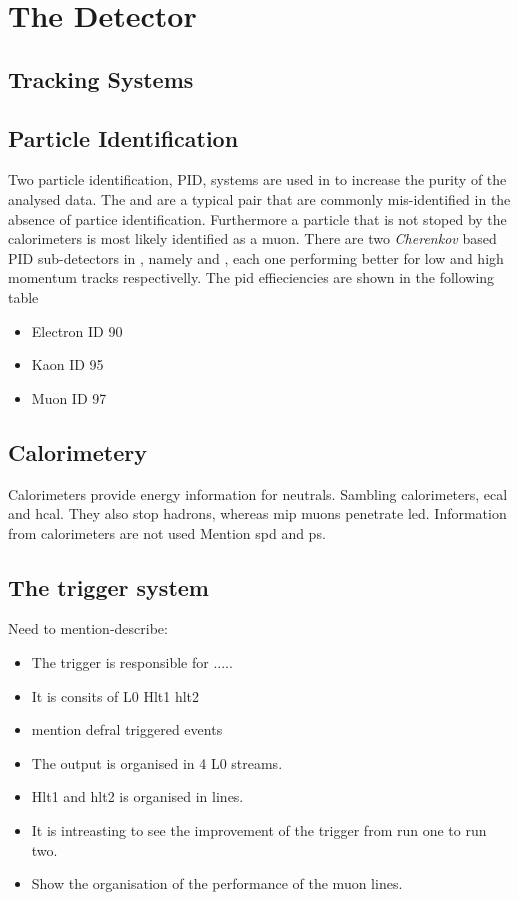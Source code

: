 
\chapter{The \lhcb Detector}
\label{lhcb_detector}



\section{Tracking Systems}
\label{det_tracking}



\section{Particle Identification}
\label{det_pid}
Two particle identification, PID, systems are used in \lhcb to increase the purity of the analysed data.
The \kaon and \pion are a typical pair that are commonly mis-identified in the absence of partice
identification. Furthermore a particle that is not stoped by the calorimeters is most likely identified
as a muon. There are two {\it Cherenkov} based PID sub-detectors in \lhcb, namely \richone and \richtwo,
each one performing better for low and high momentum tracks respectivelly. The pid effieciencies are shown
in the following table

\begin{itemize}
  \item Electron ID  90 %
  \item Kaon ID 95 %
  \item Muon ID 97 %
\end{itemize}

\section{Calorimetery}
\label{det_calo}
Calorimeters provide energy information for neutrals.
Sambling calorimeters, ecal and hcal.
They also stop hadrons, whereas mip muons penetrate led.
Information from calorimeters are not used
Mention spd and ps.

\section{The trigger system}
\label{det_trigger}

Need to mention-describe:
\begin{itemize}
  \item The trigger is responsible for .....
  \item It is consits of L0 Hlt1 hlt2
  \item mention defral triggered events
  \item The output is organised in 4 L0 streams.
  \item Hlt1 and hlt2 is organised in lines.
  \item It is intreasting to see the improvement of the trigger from run one to run two.
  \item Show the organisation of the performance of the muon lines.
\end{itemize}

